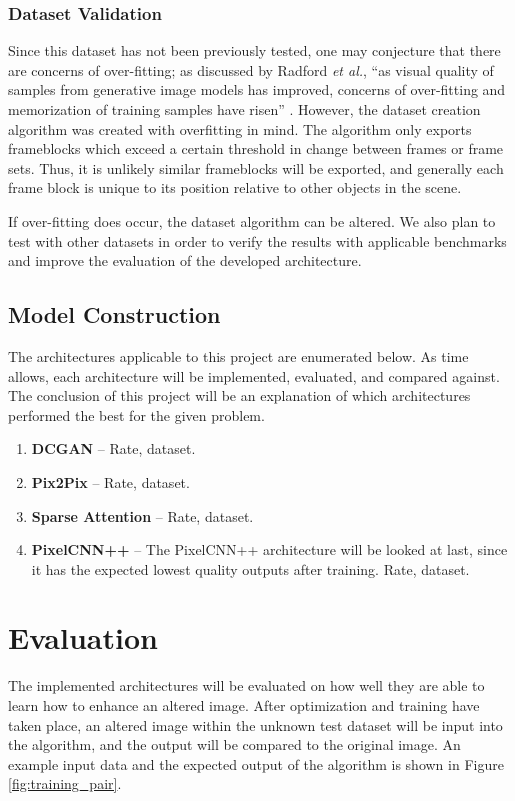 \documentclass[letterpaper]{article} %
\begin{document}
\subsubsection{Dataset Validation}
Since this dataset has not been previously tested, one may conjecture that there are
concerns of over-fitting; as discussed by Radford \textit{et al.},
``as visual quality of samples from generative image models has improved, concerns of
over-fitting and memorization of training samples have risen''
\cite{unsupervised_learning}.
However, the dataset creation algorithm was created with overfitting in mind.
The algorithm only exports frameblocks which exceed a certain threshold in change
between frames or frame sets. Thus, it is unlikely similar frameblocks will be exported,
and generally each frame block is unique to its position relative to other objects in the scene.

If over-fitting does occur,
the dataset algorithm can be altered.
We also plan to test with other datasets in order to verify the results with applicable benchmarks
and improve the evaluation of the developed architecture.

\subsection{Model Construction}
\label{subsec:model}
The architectures applicable to this project are enumerated below.
As time allows, each architecture will be implemented, evaluated, and compared
against. The conclusion of this project will be an explanation of which architectures performed the best
for the given problem.
\begin{enumerate}
\item \textbf{DCGAN} --
Rate, dataset.
\item \textbf{Pix2Pix} --
Rate, dataset.
\item \textbf{Sparse Attention} --
Rate, dataset.
\item \textbf{PixelCNN++} --
The PixelCNN++ architecture will be looked at last, since it has the expected lowest
quality outputs after training.
Rate, dataset.
\end{enumerate}

\section{Evaluation}
\label{sec:methods/evaluation}
The implemented architectures will be evaluated on how well they are able to learn how to
enhance an altered image. After optimization and training have taken place,
an altered image within the unknown test dataset will be input into the algorithm, and the output
will be compared to the original image. An example input data and the expected output
of the algorithm is shown in Figure \ref{fig:training_pair}.
\end{document}
